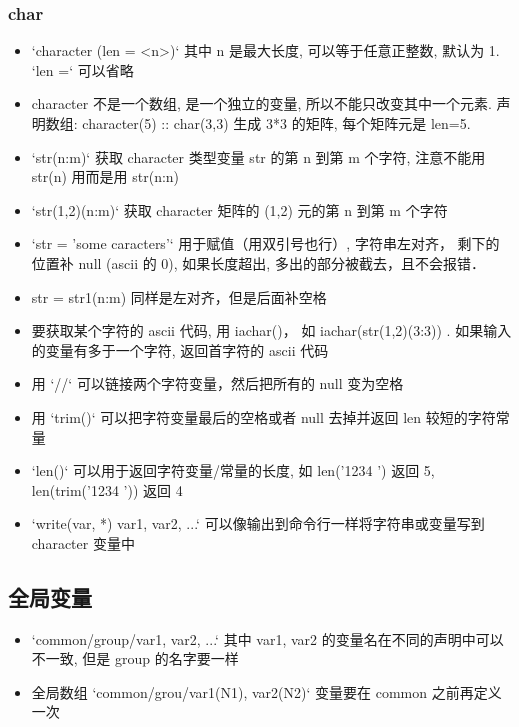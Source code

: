 \subsubsection{char}
\begin{itemize}
\item `character (len = <n>)` 其中 n 是最大长度, 可以等于任意正整数, 默认为 1.  `len =` 可以省略
\item character 不是一个数组, 是一个独立的变量, 所以不能只改变其中一个元素. 声明数组: character(5) :: char(3,3) 生成 3*3 的矩阵, 每个矩阵元是 len=5.
\item `str(n:m)` 获取 character 类型变量 str 的第 n 到第 m 个字符, 注意不能用 str(n) 用而是用 str(n:n)
\item `str(1,2)(n:m)` 获取 character 矩阵的 (1,2) 元的第 n 到第 m 个字符
\item `str = 'some caracters'` 用于赋值（用双引号也行）, 字符串左对齐， 剩下的位置补 null (ascii 的 0), 如果长度超出, 多出的部分被截去，且不会报错．
\item str = str1(n:m) 同样是左对齐，但是后面补空格
\item 要获取某个字符的 ascii 代码, 用 iachar()， 如 iachar(str(1,2)(3:3)) . 如果输入的变量有多于一个字符, 返回首字符的 ascii 代码
\item 用 `//` 可以链接两个字符变量，然后把所有的 null 变为空格
\item 用 `trim()` 可以把字符变量最后的空格或者 null 去掉并返回 len 较短的字符常量
\item `len()` 可以用于返回字符变量/常量的长度, 如 len('1234 ') 返回 5, len(trim('1234 ')) 返回 4
\item `write(var, *) var1, var2, ...` 可以像输出到命令行一样将字符串或变量写到 character 变量中
\end{itemize}

\subsection{全局变量}
\begin{itemize}
\item `common/group/var1, var2, ...` 其中 var1, var2 的变量名在不同的声明中可以不一致, 但是 group 的名字要一样
\item 全局数组 `common/grou/var1(N1), var2(N2)` 变量要在 common 之前再定义一次
\end{itemize}

